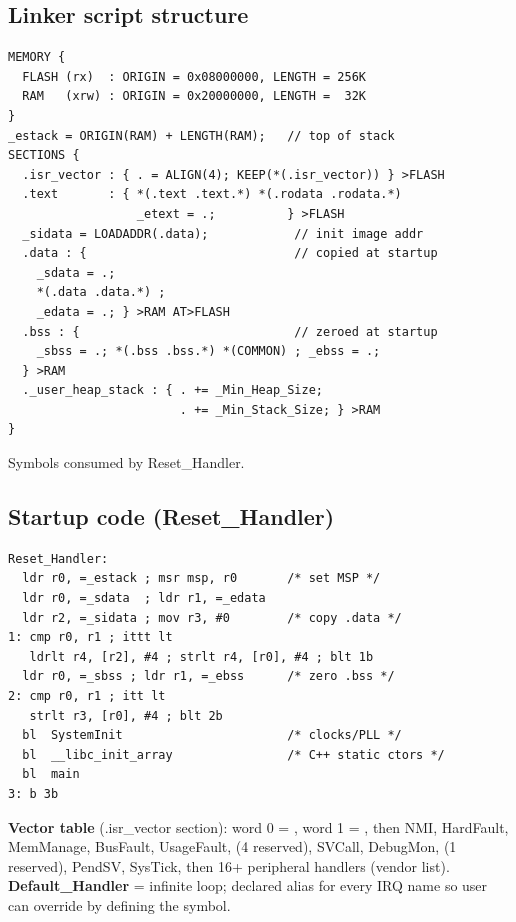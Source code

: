 \subsection{Linker script structure}
\begin{lstlisting}[language={}]
MEMORY {
  FLASH (rx)  : ORIGIN = 0x08000000, LENGTH = 256K
  RAM   (xrw) : ORIGIN = 0x20000000, LENGTH =  32K
}
_estack = ORIGIN(RAM) + LENGTH(RAM);   // top of stack
SECTIONS {
  .isr_vector : { . = ALIGN(4); KEEP(*(.isr_vector)) } >FLASH
  .text       : { *(.text .text.*) *(.rodata .rodata.*)
                  _etext = .;          } >FLASH
  _sidata = LOADADDR(.data);            // init image addr
  .data : {                             // copied at startup
    _sdata = .;
    *(.data .data.*) ;
    _edata = .; } >RAM AT>FLASH
  .bss : {                              // zeroed at startup
    _sbss = .; *(.bss .bss.*) *(COMMON) ; _ebss = .;
  } >RAM
  ._user_heap_stack : { . += _Min_Heap_Size;
                        . += _Min_Stack_Size; } >RAM
}
\end{lstlisting}
Symbols  consumed by Reset\_Handler.

\subsection{Startup code (Reset\_Handler)}
\begin{lstlisting}[language={}]
Reset_Handler:
  ldr r0, =_estack ; msr msp, r0       /* set MSP */
  ldr r0, =_sdata  ; ldr r1, =_edata
  ldr r2, =_sidata ; mov r3, #0        /* copy .data */
1: cmp r0, r1 ; ittt lt
   ldrlt r4, [r2], #4 ; strlt r4, [r0], #4 ; blt 1b
  ldr r0, =_sbss ; ldr r1, =_ebss      /* zero .bss */
2: cmp r0, r1 ; itt lt
   strlt r3, [r0], #4 ; blt 2b
  bl  SystemInit                       /* clocks/PLL */
  bl  __libc_init_array                /* C++ static ctors */
  bl  main
3: b 3b
\end{lstlisting}
\textbf{Vector table} (.isr\_vector section): word 0 = , word 1 = , then NMI, HardFault, MemManage, BusFault, UsageFault, (4 reserved), SVCall, DebugMon, (1 reserved), PendSV, SysTick, then 16+ peripheral handlers (vendor list).
\textbf{Default\_Handler} = infinite loop; declared  alias for every IRQ name so user can override by defining the symbol.

